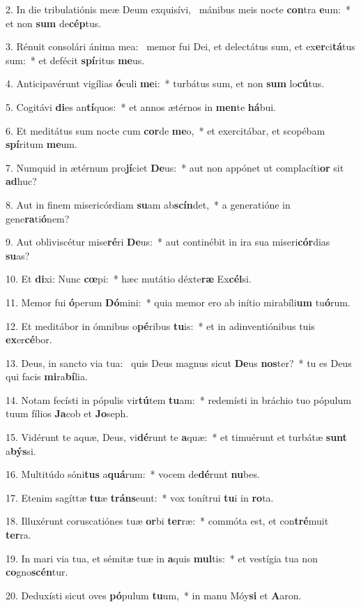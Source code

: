 2. In die tribulatiónis meæ Deum exquisívi, \dag\  mánibus meis nocte \textbf{con}tra \textbf{e}um:~*  et non \textbf{sum} de\textbf{cép}tus.\

3. Rénuit consolári ánima mea: \dag\  memor fui Dei, et delectátus sum, et ex\textbf{er}ci\textbf{tá}tus sum:~*  et defécit \textbf{spí}ritus \textbf{me}us.\

4. Anticipavérunt vigílias \textbf{ó}culi \textbf{me}i:~*  turbátus sum, et non \textbf{sum} lo\textbf{cú}tus.\

5. Cogitávi \textbf{di}es an\textbf{tí}quos:~*  et annos ætérnos in \textbf{men}te \textbf{há}bui.\

6. Et meditátus sum nocte cum \textbf{cor}de \textbf{me}o,~*  et exercitábar, et scopébam \textbf{spí}ritum \textbf{me}um.\

7. Numquid in ætérnum pro\textbf{jí}ciet \textbf{De}us:~*  aut non appónet ut complacíti\textbf{or} sit \textbf{ad}huc?\

8. Aut in finem misericórdiam \textbf{su}am ab\textbf{scín}det,~*  a generatióne in gene\textbf{ra}ti\textbf{ó}nem?\

9. Aut obliviscétur mise\textbf{ré}ri \textbf{De}us:~*  aut continébit in ira sua miseri\textbf{cór}dias \textbf{su}as?\

10. Et \textbf{di}xi: Nunc \textbf{cœ}pi:~*  hæc mutátio déxte\textbf{ræ} Ex\textbf{cél}si.\

11. Memor fui \textbf{ó}perum \textbf{Dó}mini:~*  quia memor ero ab inítio mirabíli\textbf{um} tu\textbf{ó}rum.\

12. Et meditábor in ómnibus o\textbf{pé}ribus \textbf{tu}is:~*  et in adinventiónibus tuis \textbf{ex}er\textbf{cé}bor.\

13. Deus, in sancto via tua: \dag\  quis Deus magnus sicut \textbf{De}us \textbf{nos}ter?~*  tu es Deus qui facis \textbf{mi}ra\textbf{bí}lia.\

14. Notam fecísti in pópulis vir\textbf{tú}tem \textbf{tu}am:~*  redemísti in bráchio tuo pópulum tuum fílios \textbf{Ja}cob et \textbf{Jo}seph.\

15. Vidérunt te aquæ, Deus, vi\textbf{dé}runt te \textbf{a}quæ:~*  et timuérunt et turbátæ \textbf{sunt} a\textbf{býs}si.\

16. Multitúdo sóni\textbf{tus} a\textbf{quá}rum:~*  vocem de\textbf{dé}runt \textbf{nu}bes.\

17. Etenim sagíttæ \textbf{tu}æ \textbf{tráns}eunt:~*  vox tonítrui \textbf{tu}i in \textbf{ro}ta.\

18. Illuxérunt coruscatiónes tuæ \textbf{or}bi \textbf{ter}ræ:~*  commóta est, et con\textbf{tré}muit \textbf{ter}ra.\

19. In mari via tua, et sémitæ tuæ in \textbf{a}quis \textbf{mul}tis:~*  et vestígia tua non \textbf{co}gno\textbf{scén}tur.\

20. Deduxísti sicut oves \textbf{pó}pulum \textbf{tu}um,~*  in manu Móy\textbf{si} et \textbf{A}aron.\

